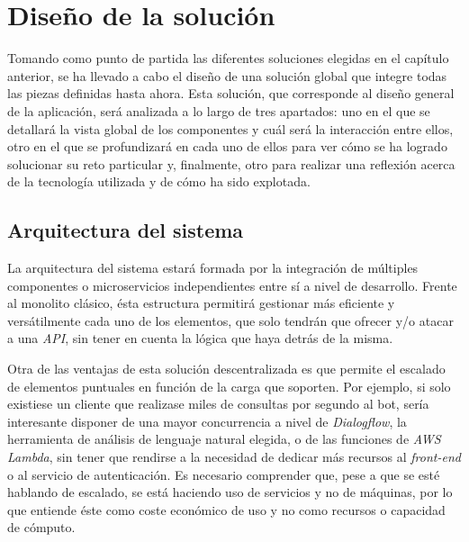 \documentclass[11pt,spanish,listoffigures]{tfgetsinf}
\begin{document}


\chapter{Diseño de la solución}
\label{ch:diseno-solu}

Tomando como punto de partida las diferentes soluciones elegidas en el capítulo anterior, se ha llevado a cabo el diseño de una solución global que integre todas las piezas definidas hasta ahora. Esta solución, que corresponde al diseño general de la aplicación, será analizada a lo largo de tres apartados: uno en el que se detallará la vista global de los componentes y cuál será la interacción entre ellos, otro en el que se profundizará en cada uno de ellos para ver cómo se ha logrado solucionar su reto particular y, finalmente, otro para realizar una reflexión acerca de la tecnología utilizada y de cómo ha sido explotada.



\section{Arquitectura del sistema}
\label{sec:arquitectura-sistema}

La arquitectura del sistema estará formada por la integración de múltiples componentes o microservicios independientes entre sí a nivel de desarrollo. Frente al monolito clásico, ésta estructura permitirá gestionar más eficiente y versátilmente cada uno de los elementos, que solo tendrán que ofrecer y/o atacar a una \textit{API}, sin tener en cuenta la lógica que haya detrás de la misma.

Otra de las ventajas de esta solución descentralizada es que permite el escalado de elementos puntuales en función de la carga que soporten. Por ejemplo, si solo existiese un cliente que realizase miles de consultas por segundo al bot, sería interesante disponer de una mayor \gls{concurrencia} a nivel de \textit{Dialogflow}, la herramienta de análisis de lenguaje natural elegida, o de las funciones de \textit{AWS Lambda}, sin tener que rendirse a la necesidad de dedicar más recursos al \textit{front-end} o al servicio de autenticación. Es necesario comprender que, pese a que se esté hablando de escalado, se está haciendo uso de servicios y no de máquinas, por lo que entiende éste como coste económico de uso y no como recursos o capacidad de cómputo.
\end{document}
